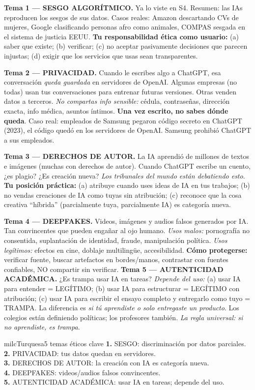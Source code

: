 \documentclass[11pt,letterpaper]{article}
\newcommand{\milcpaso}[3]{%
\Needspace{4\baselineskip}%
\begin{tcolorbox}[enhanced,colback=white,colframe=milcLinea,arc=1.5mm,boxrule=.9pt,
  left=14mm,right=4mm,top=3mm,bottom=3mm,before skip=4pt,after skip=4pt,
  fontupper=\RaggedRight,
  overlay={\node[anchor=north west,circle,fill=#2,text=white,inner sep=0pt,
    minimum size=7.4mm,font=\sffamily\bfseries\small]
    at ([xshift=3.6mm,yshift=-3.2mm]frame.north west) {#1};}]
#3
\end{tcolorbox}}
\begin{document}
\milcpaso{1}{milcTurquesa}{\textbf{Tema 1 --- SESGO ALGORÍTMICO.} Ya lo viste en S4. Resumen: las IAs reproducen los sesgos de sus datos. Casos reales: Amazon descartando CVs de mujeres, Google clasificando personas afro como animales, COMPAS sesgada en el sistema de justicia EEUU. \textbf{Tu responsabilidad ética como usuario:} (a) saber que existe; (b) verificar; (c) no aceptar pasivamente decisiones que parecen injustas; (d) exigir que los servicios que usas sean transparentes.}
\milcpaso{2}{milcTurquesa}{\textbf{Tema 2 --- PRIVACIDAD.} Cuando le escribes algo a ChatGPT, esa conversación \emph{queda guardada} en servidores de OpenAI. Algunas empresas (no todas) usan tus conversaciones para entrenar futuras versiones. Otras venden datos a terceros. \emph{No compartas info sensible:} cédula, contraseñas, dirección exacta, info médica, asuntos íntimos. \textbf{Una vez escrito, no sabes dónde queda}. Caso real: empleados de Samsung pegaron código secreto en ChatGPT (2023), el código quedó en los servidores de OpenAI. Samsung prohibió ChatGPT a sus empleados.}
\milcpaso{3}{milcTurquesa}{\textbf{Tema 3 --- DERECHOS DE AUTOR.} La IA aprendió de millones de textos e imágenes (muchas con derechos de autor). Cuando ChatGPT escribe un cuento, ¿es plagio? ¿Es creación nueva? \emph{Los tribunales del mundo están debatiendo esto}. \textbf{Tu posición práctica:} (a) atribuye cuando uses ideas de IA en tus trabajos; (b) no vendas creaciones de IA como tuyas sin atribución; (c) reconoce que la cosa creativa ``híbrida'' (parcialmente tuya, parcialmente IA) es categoría nueva.}
\milcpaso{4}{milcTurquesa}{\textbf{Tema 4 --- DEEPFAKES.} Videos, imágenes y audios falsos generados por IA. Tan convincentes que pueden engañar al ojo humano. \emph{Usos malos:} pornografía no consentida, suplantación de identidad, fraude, manipulación política. \emph{Usos legítimos:} efectos en cine, doblaje multilingüe, accesibilidad. \textbf{Cómo protegerse:} verificar fuente, buscar artefactos en bordes/manos, contrastar con fuentes confiables, NO compartir sin verificar. \textbf{Tema 5 --- AUTENTICIDAD ACADÉMICA.} ¿Es trampa usar IA en tareas? \emph{Depende del uso:} (a) usar IA para entender = LEGÍTIMO; (b) usar IA para estructurar = LEGÍTIMO con atribución; (c) usar IA para escribir el ensayo completo y entregarlo como tuyo = TRAMPA. La diferencia es \emph{si tú aprendiste o solo entregaste un producto}. Los colegios están definiendo políticas; los profesores también. \emph{La regla universal: si no aprendiste, es trampa}.}

\begin{drawbox}{milcTurquesa}{5 temas éticos clave}
\textbf{1.} SESGO: discriminación por datos parciales. \\[1mm]
\textbf{2.} PRIVACIDAD: tus datos quedan en servidores. \\[1mm]
\textbf{3.} DERECHOS DE AUTOR: la creación con IA es categoría nueva. \\[1mm]
\textbf{4.} DEEPFAKES: videos/audios falsos convincentes. \\[1mm]
\textbf{5.} AUTENTICIDAD ACADÉMICA: usar IA en tareas; depende del uso.
\end{drawbox}
\end{document}
